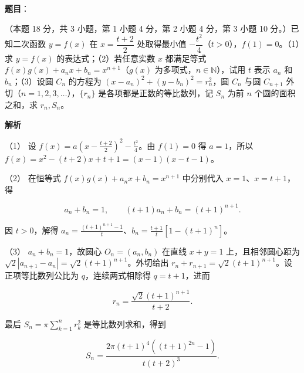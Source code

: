 \begin{answer}

\textbf{题目}：

（本题 18 分，共 3 小题，第 1 小题 4 分，第 2 小题 4 分，第 3 小题 10 分。）已知二次函数 $y=f(x)$ 在 $x=\dfrac{t+2}{2}$ 处取得最小值 $-\dfrac{t^2}{4}$（$t>0$），$f(1)=0$。（1）求 $y=f(x)$ 的表达式；（2）若任意实数 $x$ 都满足等式 $f(x)g(x)+a_nx+b_n=x^{n+1}$（$g(x)$ 为多项式，$n\in\mathbb N$），试用 $t$ 表示 $a_n$ 和 $b_n$；（3）设圆 $C_n$ 的方程为 $(x-a_n)^2+(y-b_n)^2=r_n^2$，圆 $C_n$ 与圆 $C_{n+1}$ 外切（$n=1,2,3,\ldots$），$\{r_n\}$ 是各项都是正数的等比数列，记 $S_n$ 为前 $n$ 个圆的面积之和，求 $r_n,S_n$。

\textbf{解析}

（1） 设 $f(x)=a(x-\frac{t+2}{2})^2-\frac{t^2}{4}$。由 $f(1)=0$ 得 $a=1$，所以 $f(x)=x^2-(t+2)x+t+1=(x-1)(x-t-1)$。

（2） 在恒等式 $f(x)g(x)+a_nx+b_n=x^{n+1}$ 中分别代入 $x=1$、$x=t+1$，得

\nopagebreak[4]
\[a_n+b_n=1,\qquad (t+1)a_n+b_n=(t+1)^{n+1}.\]

因 $t>0$，解得 $a_n=\frac{(t+1)^{n+1}-1}{t}$、$b_n=\frac{t+1}{t}[1-(t+1)^n]$。

（3） $a_n+b_n=1$，故圆心 $O_n=(a_n,b_n)$ 在直线 $x+y=1$ 上，且相邻圆心距为 $\sqrt2|a_{n+1}-a_n|=\sqrt2(t+1)^{n+1}$。外切给出 $r_n+r_{n+1}=\sqrt2(t+1)^{n+1}$。设正项等比数列公比为 $q$，连续两式相除得 $q=t+1$，进而

\nopagebreak[4]
\[r_n=\frac{\sqrt2(t+1)^{n+1}}{t+2}.\]

最后 $S_n=\pi\sum_{k=1}^n r_k^2$ 是等比数列求和，得到

\nopagebreak[4]
\[S_n=\frac{2\pi(t+1)^4((t+1)^{2n}-1)}{t(t+2)^3}.\]


\end{answer}